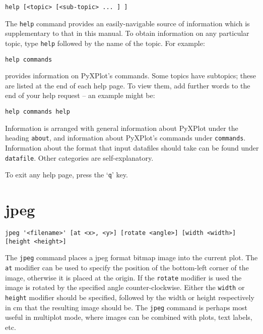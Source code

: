 \documentclass[a4paper,onecolumn,11pt]{book}
\begin{document}
\begin{verbatim}
help [<topic> [<sub-topic> ... ] ]
\end{verbatim}

The {\tt help} command provides an easily-navigable source of information which
is supplementary to that in this manual.  To obtain information on any
particular topic, type {\tt help} followed by the name of the topic. For
example:

\begin{verbatim}
help commands
\end{verbatim}

\noindent provides information on PyXPlot's commands. Some topics have subtopics; these
are listed at the end of each help page. To view them, add further words to the
end of your help request -- an example might be:

\begin{verbatim}
help commands help
\end{verbatim}

Information is arranged with general information about PyXPlot under the heading
{\tt about}, and information about PyXPlot's commands under {\tt commands}.
Information about the format that input datafiles should take can be found
under {\tt datafile}.  Other categories are self-explanatory.

To exit any help page, press the `{\tt q}' key.

\section{jpeg}

\begin{verbatim}
jpeg '<filename>' [at <x>, <y>] [rotate <angle>] [width <width>] [height <height>]
\end{verbatim}

The {\tt jpeg} command places a jpeg format bitmap image into the current plot.
The {\tt at} modifier can be used to specify the position of the bottom-left
corner of the image, otherwise it is placed at the origin.  If the {\tt rotate}
modifier is used the image is rotated by the specified angle counter-clockwise.
Either the {\tt width} or {\tt height} modifier should be specified, followed by
the width or height respectively in cm that the resulting image should be.  The
{\tt jpeg} command is perhaps most useful in multiplot mode, where images can be
combined with plots, text labels, etc.
\end{document}
